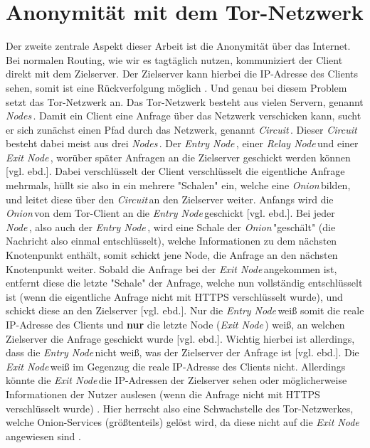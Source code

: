 \documentclass[a4paper,ngerman, headheight=28pt,12pt]{scrartcl}
\newcommand{\vcite}[1]{\cite[vgl.][]{#1}}
\newcommand{\vebd}{[vgl. ebd.]}
\newcommand{\entryn}{\textit{Entry Node\,}}
\newcommand{\relayn}{\textit{Relay Node\,}}
\newcommand{\exitn}{\textit{Exit Node\,}}
\newcommand{\nodes}{\textit{Nodes\,}}
\newcommand{\node}{\textit{Node\,}}
\newcommand{\onion}{\textit{Onion\,}}
\newcommand{\circuit}{\textit{Circuit\,}}
\begin{document}
\section{Anonymität mit dem Tor-Netzwerk}
Der zweite zentrale Aspekt dieser Arbeit ist die Anonymität über das Internet. Bei normalen Routing, wie wir es tagtäglich nutzen, kommuniziert der Client direkt mit dem Zielserver. Der Zielserver kann hierbei die IP-Adresse des Clients sehen, somit ist eine Rückverfolgung möglich \vcite{LocPolice,TCP_IP}. Und genau bei diesem Problem setzt das Tor-Netzwerk an. Das Tor-Netzwerk besteht aus vielen Servern, genannt \nodes \vcite{TorStructure}. Damit ein Client eine Anfrage über das Netzwerk verschicken kann, sucht er sich zunächst einen Pfad durch das Netzwerk, genannt \circuit \vcite{TorCircuits}. Dieser \circuit besteht dabei meist aus drei \nodes. Der \entryn, einer \relayn und einer \exitn, worüber später Anfragen an die Zielserver geschickt werden können \vebd.
Dabei verschlüsselt der Client verschlüsselt die eigentliche Anfrage mehrmals, hüllt sie also in ein mehrere "Schalen" ein, welche eine \onion bilden, und leitet diese über den \circuit an den Zielserver weiter\vcite{TorStructure}. Anfangs wird die \onion von dem Tor-Client an die \entryn geschickt \vebd. Bei jeder \node, also auch der \entryn, wird eine Schale der \onion "geschält" (die Nachricht also einmal entschlüsselt), welche Informationen zu dem nächsten Knotenpunkt enthält, somit schickt jene Node, die Anfrage an den nächsten Knotenpunkt weiter\vcite{TorStructure2}.
Sobald die Anfrage bei der \exitn angekommen ist, entfernt diese die letzte "Schale" der Anfrage, welche nun vollständig entschlüsselt ist (wenn die eigentliche Anfrage nicht mit HTTPS verschlüsselt wurde), und schickt diese an den Zielserver \vebd. Nur die \entryn weiß somit die reale IP-Adresse des Clients und \textbf{nur} die letzte Node (\exitn) weiß, an welchen Zielserver die Anfrage geschickt wurde \vebd. Wichtig hierbei ist allerdings, dass die \entryn nicht weiß, was der Zielserver der Anfrage ist \vebd. Die \exitn weiß im Gegenzug die reale IP-Adresse des Clients nicht. Allerdings könnte die \exitn die IP-Adressen der Zielserver sehen oder möglicherweise Informationen der Nutzer auslesen (wenn die Anfrage nicht mit HTTPS verschlüsselt wurde) \vcite{TorExitNodeVulnerability}. Hier herrscht also eine Schwachstelle des Tor-Netzwerkes, welche Onion-Services (größtenteils) gelöst wird, da diese nicht auf die \exitn angewiesen sind \vcite{TorOnionService}.
\end{document}
